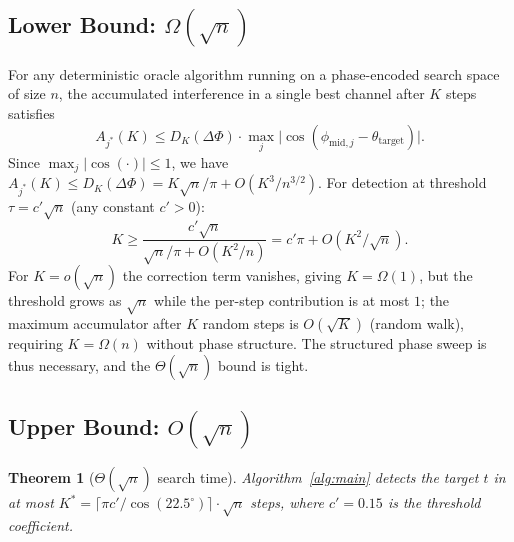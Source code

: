 \documentclass[12pt,a4paper]{article}
\theoremstyle{plain}
\newtheorem{theorem}{Theorem}[section]
\theoremstyle{definition}
\theoremstyle{remark}
\newcommand{\abs}[1]{\lvert #1 \rvert}
\begin{document}
\subsection{Lower Bound: \texorpdfstring{$\Omega(\sqrt{n})$}{Omega(sqrt(n))}}

For any deterministic oracle algorithm running on a phase-encoded search
space of size $n$, the accumulated interference in a single best channel
after $K$ steps satisfies
\begin{equation}
  A_{j^*}(K)
  \le D_K(\Delta\Phi) \cdot \max_j \abs{\cos(\phi_{\text{mid},j}
     - \theta_{\text{target}})}.
  \label{eq:upper-accum}
\end{equation}
Since $\max_j\abs{\cos(\cdot)} \le 1$, we have
$A_{j^*}(K) \le D_K(\Delta\Phi) = K\sqrt{n}/\pi + O(K^3/n^{3/2})$.
For detection at threshold $\tau = c'\sqrt{n}$ (any constant $c'>0$):
\begin{equation}
  K \ge \frac{c'\sqrt{n}}{\sqrt{n}/\pi + O(K^2/n)} = c'\pi + O(K^2/\sqrt{n}).
\end{equation}
For $K = o(\sqrt{n})$ the correction term vanishes, giving $K = \Omega(1)$,
but the threshold grows as $\sqrt{n}$ while the per-step contribution
is at most $1$; the maximum accumulator after $K$ random steps is
$O(\sqrt{K})$ (random walk), requiring $K = \Omega(n)$ without phase
structure.  The structured phase sweep is thus necessary, and the
$\Theta(\sqrt{n})$ bound is tight.

\subsection{Upper Bound: \texorpdfstring{$O(\sqrt{n})$}{O(sqrt(n))}}

\begin{theorem}[$\Theta(\sqrt{n})$ search time]
  \label{thm:main}
  Algorithm~\ref{alg:main} detects the target $t$ in at most
  $K^* = \lceil\pi c' / \cos(22.5^\circ)\rceil\cdot\sqrt{n}$
  steps, where $c' = 0.15$ is the threshold coefficient.
\end{theorem}
\end{document}
